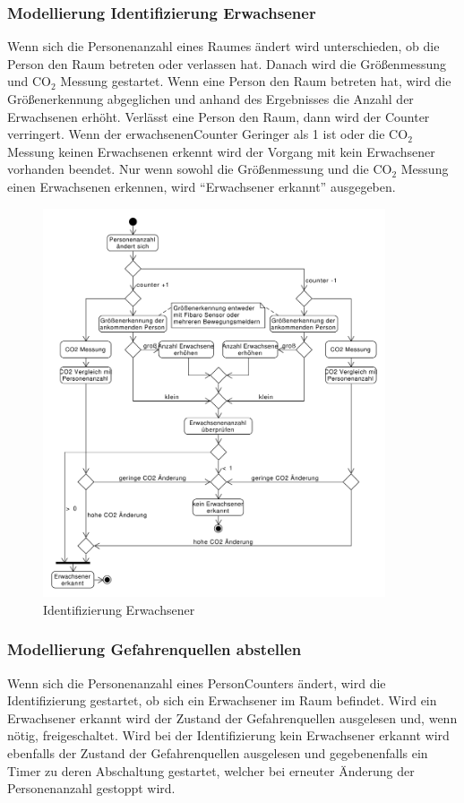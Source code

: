 \subsubsection{Modellierung Identifizierung Erwachsener}
Wenn sich die Personenanzahl eines Raumes ändert wird unterschieden, ob die Person den Raum betreten oder verlassen hat. Danach wird die Größenmessung und CO$_2$ Messung gestartet. Wenn eine Person den Raum betreten hat, wird die Größenerkennung abgeglichen und anhand des Ergebnisses die Anzahl der Erwachsenen erhöht. Verlässt eine Person den Raum, dann wird der Counter verringert. Wenn der erwachsenenCounter Geringer als 1 ist oder die CO$_2$ Messung keinen Erwachsenen erkennt wird der Vorgang mit kein Erwachsener vorhanden beendet. Nur wenn sowohl die Größenmessung und die CO$_2$ Messung einen Erwachsenen erkennen, wird "`Erwachsener erkannt"' ausgegeben.
\begin{figure}[h!]
	\centering
	\includegraphics[width=0.9\textwidth]{img/Szenarien/IdentifizierungErwachsene.pdf}
	\caption{Identifizierung Erwachsener}
	\label{fig:szenarienIdentifizierungErwachsene}
\end{figure}

\newpage

\subsubsection{Modellierung Gefahrenquellen abstellen}
Wenn sich die Personenanzahl eines PersonCounters ändert, wird die Identifizierung gestartet, ob sich ein Erwachsener im Raum befindet. Wird ein Erwachsener erkannt wird der Zustand der Gefahrenquellen ausgelesen und, wenn nötig, freigeschaltet. Wird bei der Identifizierung kein Erwachsener erkannt wird ebenfalls der Zustand der Gefahrenquellen ausgelesen und gegebenenfalls ein Timer zu deren Abschaltung gestartet, welcher bei erneuter Änderung der Personenanzahl gestoppt wird.

